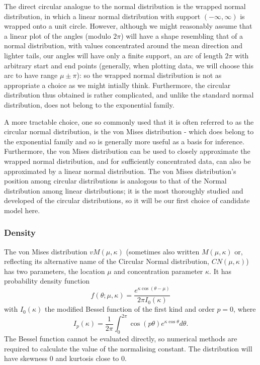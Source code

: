 \documentclass[../../ArchStats.tex]{subfiles}
\begin{document}
The direct circular analogue to the normal distribution is the wrapped normal distribution, in which a linear normal distribution with support $(-\infty, \infty)$ is wrapped onto a unit circle. However, although we might reasonably assume that a linear plot of the angles (modulo $2\pi$) will have a shape resembling that of a normal distribution, with values concentrated around the mean direction and lighter tails, our angles will have only a finite support, an arc of length $2\pi$ with arbitrary start and end points (generally, when plotting data, we will choose this arc to have range $\mu \pm \pi$): so the wrapped normal distribution is not as appropriate a choice as we might intially think. Furthermore, the circular distribution thus obtained is rather complicated, and unlike the standard normal distribution, does not belong to the exponential family.

A more tractable choice, one so commonly used that it is often referred to as the circular normal distribution, is the von Mises distribution - which does belong to the exponential family and so is generally more useful as a basis for inference. Furthermore, the von Mises distribution can be used to closely approximate the wrapped normal distribution, and for sufficiently concentrated data, can also be approximated by a linear normal distribution. The von Mises distribution's position among circular distributions is analogous to that of the Normal  distribution among linear distributions; it is the most thoroughly studied and developed of the circular distributions, so it will be our first choice of candidate model here. %

\subsubsection{Density}
The von Mises distribution $vM(\mu, \kappa)$ (sometimes also written $M(\mu, \kappa)$ or, reflecting its alternative name of the Circular Normal distribution, $CN(\mu, \kappa)$) has two parameters, the location $\mu$ and concentration parameter $\kappa$. It has probability density function 
\[f(\theta; \mu, \kappa) = \frac{e^{\kappa \cos(\theta - \mu)}}{2\pi I_0(\kappa)}\]
with $I_0(\kappa)$ the modified Bessel function of the first kind and order $p=0$, where
\begin{equation}
\label{eq:mod-Bessel}
I_p(\kappa) = \frac{1}{2\pi}\int_0^{2\pi} \cos(p\theta)e^{\kappa \cos \theta} d\theta.
\end{equation}
The Bessel function cannot be evaluated directly, so numerical methods are required to calculate the value of the normalising constant. The distribution will have skewness 0 and kurtosis close to 0.
\end{document}

